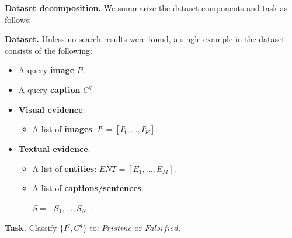 
\textbf{Dataset decomposition.}
We summarize the dataset components and task as follows:
\begin{mdframed}[linecolor=gray(x11gray),backgroundcolor=lightgray,roundcorner=20pt,linewidth=1pt]
\textbf{Dataset.} Unless no search results were found, a single example in the dataset consists of the following:
\begin{itemize}[noitemsep,topsep=0pt]
\item A query \textbf{\textcolor{myOrange}{image}} $I^q$.
\item A query \textbf{\textcolor{myblue}{caption}} $C^q$.
\item \textbf{\textcolor{myOrange}{Visual evidence}}: 
    \begin{itemize}[noitemsep,topsep=0pt] 
    \item A list of \textbf{images}: $I^e = [I^e_1, ..., I^e_K]$.
    \end{itemize}
\item \textbf{\textcolor{myblue}{Textual evidence}}:
    \begin{itemize}[noitemsep,topsep=0pt]
        \item A list of \textbf{entities}: $\textit{ENT} = [\textit{E}_1, ..., \textit{E}_M]$. 
        \item A list of \textbf{captions/sentences}:
        
        $S = [S_1, ..., S_N]$.
    \end{itemize}
\end{itemize}
\textbf{Task.} Classify $\{I^q,C^q\}$ to: $\textit{Pristine}$ or $\textit{Falsified}$.
\end{mdframed}


